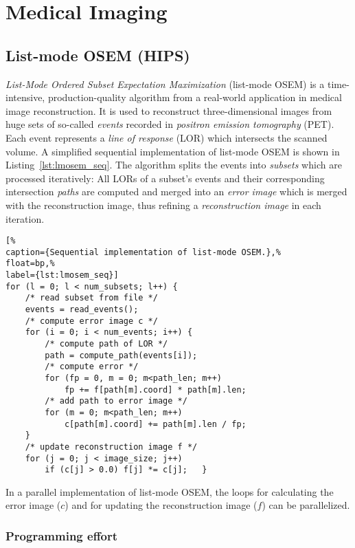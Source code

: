 \section{Medical Imaging}
\label{section:medical-imaging}

\subsection{List-mode OSEM (HIPS)}

\emph{List-Mode Ordered Subset Expectation Maximization} (list-mode OSEM) is a time-intensive, production-quality algorithm from a real-world application in medical image reconstruction.
It is used to reconstruct three-dimensional images from huge sets of so-called \emph{events} recorded in \emph{positron emission tomography} (PET).
Each event represents a \emph{line of response} (LOR) which intersects the scanned volume.
A simplified sequential implementation of list-mode OSEM is shown in Listing~\ref{lst:lmosem_seq}.
The algorithm splits the events into \emph{subsets} which are processed iteratively:
All LORs of a subset's events and their corresponding intersection \emph{paths} are computed and merged into an \emph{error image} which is merged with the reconstruction image, thus refining a \emph{reconstruction image} in each iteration.

\begin{lstlisting}[%
caption={Sequential implementation of list-mode OSEM.},%
float=bp,%
label={lst:lmosem_seq}]
for	(l = 0; l < num_subsets; l++) {
	/* read subset from file */
	events = read_events();
	/* compute error image c */
	for	(i = 0; i < num_events; i++) {
		/* compute path of LOR */
		path = compute_path(events[i]);
		/* compute error */
		for	(fp = 0, m = 0; m<path_len; m++)
			fp += f[path[m].coord] * path[m].len;
		/* add path to error image */
		for (m = 0; m<path_len; m++)
			c[path[m].coord] += path[m].len / fp;
	}
	/* update reconstruction image f */
	for	(j = 0; j < image_size; j++)
		if (c[j] > 0.0) f[j] *= c[j];	}
\end{lstlisting}

In a parallel implementation of list-mode OSEM, the loops for calculating the error image ($c$) and for updating the reconstruction image ($f$) can be parallelized.

\subsubsection{Programming effort}

